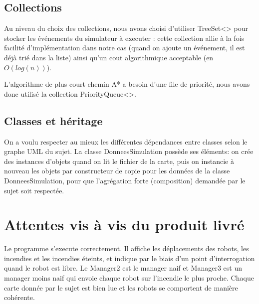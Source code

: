 \documentclass[a4paper,11pt]{article}
\begin{document}
\subsection{Collections}

Au niveau du choix des collections, nous avons choisi d'utiliser TreeSet<> pour stocker les événements du simulateur à executer : cette collection allie à la fois facilité d'implémentation dans notre cas (quand on ajoute un événement, il est déjà trié dans la liste) ainsi qu'un cout algorithmique acceptable (en $O(log(n))$).

L'algorithme de plus court chemin A* a besoin d'une file de priorité, nous avons donc utilisé la collection PriorityQueue<>.

\subsection{Classes et héritage}

On a voulu respecter au mieux les différentes dépendances entre classes selon le graphe UML du sujet. 
La classe DonneesSimulation possède ses éléments: on crée des instances d'objets quand on lit le fichier de la carte, puis on instancie à nouveau les objets par constructeur de copie pour les données de la classe DonneesSimulation, pour que l'agrégation forte (composition) demandée par le sujet soit respectée.


\section{Attentes vis à vis du produit livré}

Le programme s'execute correctement. Il affiche les déplacements des robots, les incendies et les incendies éteints, et indique par le biais d'un point d'interrogation quand le robot est libre.
Le Manager2 est le manager naif et Manager3 est un manager moins naif qui envoie chaque robot sur l'incendie le plus proche.
Chaque carte donnée par le sujet est bien lue et les robots se comportent de manière cohérente.
\end{document}
